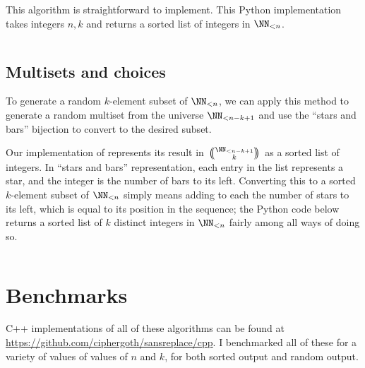 \documentclass[letterpaper,luatex,11pt]{article}
\newcommand{\multichoose}[2]{
\left.\mathchoice
  {\left(\kern-0.48em\binom{#1}{#2}\kern-0.48em\right)}
  {\big(\kern-0.30em\binom{\smash{#1}}{\smash{#2}}\kern-0.30em\big)}
  {\left(\kern-0.30em\binom{\smash{#1}}{\smash{#2}}\kern-0.30em\right)}
  {\left(\kern-0.30em\binom{\smash{#1}}{\smash{#2}}\kern-0.30em\right)}
\right.}
\begin{document}
This algorithm is straightforward to implement. This Python implementation takes integers
$n, k$ and returns a sorted list of integers in \(\NN_{<n}\).

\inputminted{Python}{code/choose_multiset.py}

\subsection{Multisets and choices}

To generate a random \(k\)-element subset of \(\NN_{<n}\),
we can apply this method to generate a random multiset from the universe \(\NN_{<n-k + 1}\)
and use the ``stars and bars'' bijection to convert to the desired subset.

Our implementation of 
represents its result in \(\multichoose{\NN_{<n-k + 1}}{k}\) as a sorted list of integers.
In ``stars and bars'' representation,
each entry in the list represents a star, and the integer is the number of bars to its left.
Converting this to a sorted \(k\)-element subset of \(\NN_{<n}\) simply means adding to each
the number of stars to its left, which is equal to its position in the sequence; the Python code
below returns a sorted list of $k$ distinct integers in \(\NN_{<n}\) fairly among all ways
of doing so.

\inputminted{Python}{code/choose_binom.py}

\section{Benchmarks}

C++ implementations of all of these algorithms can be found at 
\url{https://github.com/ciphergoth/sansreplace/cpp}. I benchmarked
all of these for a variety of values of values of \(n\) and \(k\),
for both sorted output and random output. 

\printbibliography
\end{document}
